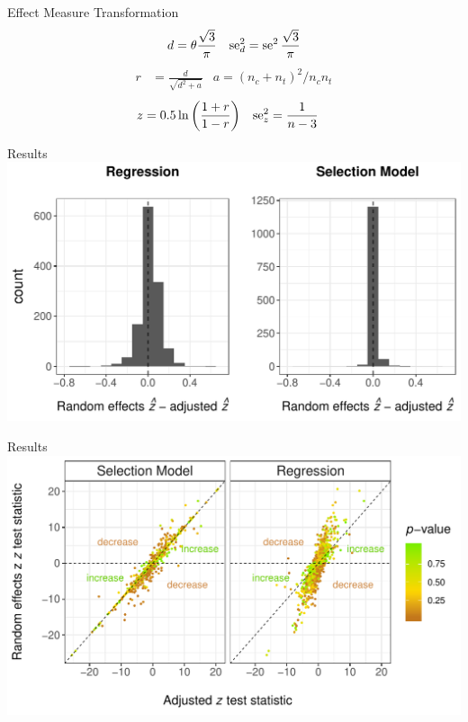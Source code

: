 \documentclass[english]{beamer}\usepackage[]{graphicx}\usepackage[]{color}
\makeatletter
\def\maxwidth{ %
  \ifdim\Gin@nat@width>\linewidth
    \linewidth
  \else
    \Gin@nat@width
  \fi
}
\newenvironment{knitrout}{}{} %
\makeatother
\begin{document}
\begin{frame}{Effect Measure Transformation}
\vspace{-3mm}
\begin{align}
d &= \theta \frac{\sqrt{3}}{\pi} & \operatorname{se}_d^2 =  \operatorname{se}^2\frac{\sqrt{3}}{\pi} \nonumber
\end{align}
\begin{align}
r &= \frac{d}{\sqrt{d^2 + a}} & a = (n_c + n_t)^2 / n_c n_t \nonumber
\end{align}
\begin{align}
z &= 0.5 \ln\bigg(\frac{1 + r}{1 - r}\bigg) & \nonumber
\operatorname{se}_z^2 &= \frac{1}{n-3}
\end{align}
\end{frame}

\begin{frame}[fragile]{Results}
\begin{knitrout}
\color{fgcolor}
\includegraphics[width=\maxwidth]{figure/unnamed-chunk-6-1} 

\end{knitrout}
\end{frame}


\begin{frame}{Results}
% 
\begin{knitrout}
\color{fgcolor}
\includegraphics[width=\maxwidth]{figure/unnamed-chunk-7-1} 

\end{knitrout}

\end{frame}
\end{document}
